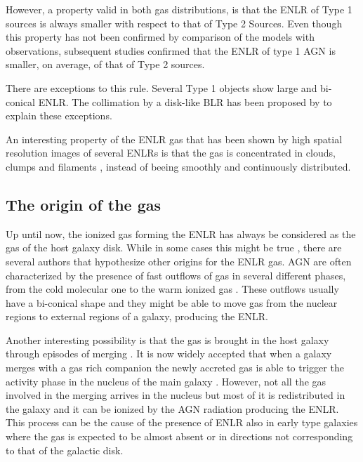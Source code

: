 \documentclass[../thesis.tex]{subfiles}
\begin{document}
However, a property valid in both gas distributions, is that the ENLR of Type 1 sources is always smaller with respect to that of Type 2 Sources.
Even though this property has not been confirmed by \citet{Mulchaey96b} comparison of the models with observations, subsequent studies \citep[e.g.][]{Schmitt03b} confirmed that the ENLR of type 1 AGN is smaller, on average, of that of Type 2 sources.

There are exceptions to this rule.
Several Type 1 objects \citep[e.g. NGC 4151][]{Pogge89,Evans93} show large and bi-conical ENLR.
The collimation by a disk-like BLR has been proposed by \citet{Evans93} to explain these exceptions.

An interesting property of the ENLR gas that has been shown by high spatial resolution images of several ENLRs is that the gas is concentrated in clouds, clumps and filaments \citep[e.g.][]{Tadhunter89,Mulchaey96a,Mulchaey96b,Schmitt03,Schmitt03b}, instead of beeing smoothly and continuously distributed.

\subsection{The origin of the gas}

Up until now, the ionized gas forming the ENLR has always be considered as the gas of the host galaxy disk.
While in some cases this might be true \citep[e.g.][]{Fischer17}, there are several authors that hypothesize other origins for the ENLR gas.
AGN are often characterized by the presence of fast outflows of gas in several different phases, from the cold molecular one to the warm ionized gas \citep{Baldwin87,Hutchings98,Crenshaw00,Crenshaw00b,Dasyra15,Morganti15,Morganti18}.
These outflows usually have a bi-conical shape \citep{Pogge88,Schmitt94,Fischer13} and they might be able to move gas from the nuclear regions to external regions of a galaxy, producing the ENLR.

Another interesting possibility is that the gas is brought in the host galaxy through episodes of merging \citep{Veilleux99,Ciroi05,DiMille07,Cracco11}.
It is now widely accepted that when a galaxy merges with a gas rich companion the newly accreted gas is able to trigger the activity phase in the nucleus of the main galaxy \citep{Sanders88,Hong15}.
However, not all the gas involved in the merging arrives in the nucleus but most of it is redistributed in the galaxy and it can be ionized by the AGN radiation producing the ENLR.
This process can be the cause of the presence of ENLR also in early type galaxies where the gas is expected to be almost absent or in directions not corresponding to that of the galactic disk.
\end{document}

